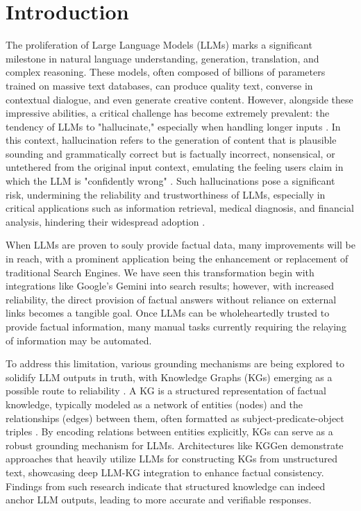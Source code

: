 \documentclass{article}
\begin{document}
\section{Introduction}
\label{sec:introduction}
The proliferation of Large Language Models (LLMs) marks a significant milestone in natural language understanding, generation, translation, and complex reasoning. These models, often composed of billions of parameters trained on massive text databases, can produce quality text, converse in contextual dialogue, and even generate creative content.
However, alongside these impressive abilities, a critical challenge has become extremely prevalent: the tendency of LLMs to "hallucinate," especially when handling longer inputs \citep{ji2023survey}. In this context, hallucination refers to the generation of content that is plausible sounding and grammatically correct but is factually incorrect, nonsensical, or untethered from the original input context, emulating the feeling users claim in which the LLM is "confidently wrong" \citep{rawte2023survey}. Such hallucinations pose a significant risk, undermining the reliability and trustworthiness of LLMs, especially in critical applications such as information retrieval, medical diagnosis, and financial analysis, hindering their widespread adoption \citep{weidinger2021ethical}.

When LLMs are proven to souly provide factual data, many improvements will be in reach, with a prominent application being the enhancement or replacement of traditional Search Engines. We have seen this transformation begin with integrations like Google's Gemini into search results; however, with increased reliability, the direct provision of factual answers without reliance on external links becomes a tangible goal. Once LLMs can be wholeheartedly trusted to provide factual information, many manual tasks currently requiring the relaying of information may be automated.

To address this limitation, various grounding mechanisms are being explored to solidify LLM outputs in truth, with Knowledge Graphs (KGs) emerging as a possible route to reliability \citep{pan2023unifying}. A KG is a structured representation of factual knowledge, typically modeled as a network of entities (nodes) and the relationships (edges) between them, often formatted as subject-predicate-object triples \citep{hogan2021knowledge}. By encoding relations between entities explicitly, KGs can serve as a robust grounding mechanism for LLMs. Architectures like KGGen \citep{KGGen_Arxiv_2025} demonstrate approaches that heavily utilize LLMs for constructing KGs from unstructured text, showcasing deep LLM-KG integration to enhance factual consistency. Findings from such research indicate that structured knowledge can indeed anchor LLM outputs, leading to more accurate and verifiable responses.
\end{document}
